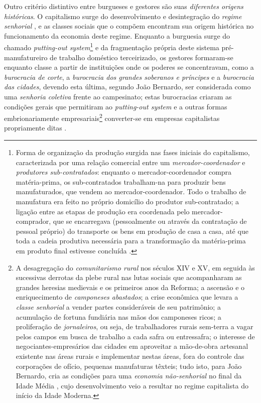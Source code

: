 Outro critério distintivo entre burgueses e gestores são suas \textit{diferentes origens históricas}. O capitalismo surge do desenvolvimento e desintegração do \textit{regime senhorial} \cite{BERNARDO1995, BERNARDO1997, BERNARDO2002}, e as classes sociais que o compõem encontram sua origem histórica no funcionamento da economia deste regime.  Enquanto a burguesia surge do chamado \textit{putting-out system}\footnote{Forma de organização da produção surgida nas fases iniciais do capitalismo, caracterizada por uma relação comercial entre um \textit{mercador-coordenador} e \textit{produtores sub-contratados}: enquanto o mercador-coordenador compra matéria-prima, os sub-contratados trabalham-na para produzir bens manufaturados, que vendem ao mercador-coordenador. Todo o trabalho de manufatura era feito no próprio domicílio do produtor sub-contratado; a ligação entre as etapas de produção era coordenada pelo mercador-comprador, que se encarregava (pessoalmente ou através da contratação de pessoal próprio) do transporte os bens em produção de casa a casa, até que toda a cadeia produtiva necessária para a transformação da matéria-prima em produto final estivesse concluída \cite[p.~215-216]{WILLIAMSON1985}.} e da fragmentação própria deste sistema pré-manufatureiro de trabalho doméstico terceirizado, os gestores formaram-se enquanto classe a partir de instituições onde os poderes se concentravam, como a \textit{burocracia de corte}, a \textit{burocracia dos grandes soberanos e príncipes} e a \textit{burocracia das cidades}, devendo esta última, segundo João Bernardo, ser considerada como uma \textit{senhoria coletiva} frente ao campesinato; estas burocracias criaram as condições gerais que permitiram ao \textit{putting-out system} e a outras formas embrionariamente empresariais\footnote{A desagregação do \textit{comunitarismo rural} nos séculos XIV e XV, em seguida às sucessivas derrotas da plebe rural nas lutas sociais que acompanharam as grandes heresias medievais e os primeiros anos da Reforma; a ascensão e o enriquecimento de \textit{camponeses abastados}; a crise econômica que levara a \textit{classe senhorial} a vender partes consideráveis de seu patrimônio; a acumulação de fortuna fundiária nas mãos dos camponeses ricos; a proliferação de \textit{jornaleiros}, ou seja, de trabalhadores rurais sem-terra a vagar pelos campos em busca de trabalho a cada safra ou entressafra; o interesse de negociantes-empresários das cidades em aproveitar a mão-de-obra artesanal existente nas áreas rurais e implementar nestas áreas, fora do controle das corporações de ofício, pequenas manufaturas têxteis; tudo isto, para João Bernardo, cria as condições para uma \textit{economia não-senhorial} no final da Idade Média \cite[p.~579-623]{BERNARDO2002}, cujo desenvolvimento veio a resultar no regime capitalista do início da Idade Moderna.} converter-se em empresas capitalistas propriamente ditas \cite[p.~208]{BERNARDO1991}. 

